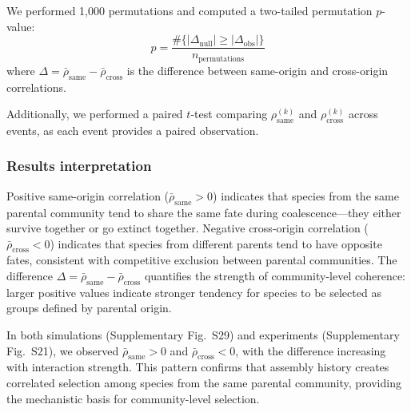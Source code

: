 We performed 1,000 permutations and computed a two-tailed permutation $p$-value:
\begin{equation}
p = \frac{\#\{|\Delta_{\text{null}}| \geq |\Delta_{\text{obs}}|\}}{n_{\text{permutations}}}
\end{equation}
where $\Delta = \bar{\rho}_{\text{same}} - \bar{\rho}_{\text{cross}}$ is the difference between same-origin and cross-origin correlations.

Additionally, we performed a paired $t$-test comparing $\rho_{\text{same}}^{(k)}$ and $\rho_{\text{cross}}^{(k)}$ across events, as each event provides a paired observation.

\subsubsection*{Results interpretation}

Positive same-origin correlation ($\bar{\rho}_{\text{same}} > 0$) indicates that species from the same parental community tend to share the same fate during coalescence---they either survive together or go extinct together. Negative cross-origin correlation ($\bar{\rho}_{\text{cross}} < 0$) indicates that species from different parents tend to have opposite fates, consistent with competitive exclusion between parental communities. The difference $\Delta = \bar{\rho}_{\text{same}} - \bar{\rho}_{\text{cross}}$ quantifies the strength of community-level coherence: larger positive values indicate stronger tendency for species to be selected as groups defined by parental origin.

In both simulations (Supplementary Fig.~S29) and experiments (Supplementary Fig.~S21), we observed $\bar{\rho}_{\text{same}} > 0$ and $\bar{\rho}_{\text{cross}} < 0$, with the difference increasing with interaction strength. This pattern confirms that assembly history creates correlated selection among species from the same parental community, providing the mechanistic basis for community-level selection.

